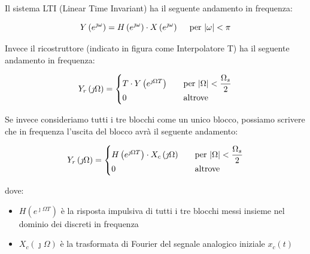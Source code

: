 Il sistema LTI (Linear Time Invariant) ha il seguente andamento in frequenza: 

{
    \Large 
    \begin{equation}
        Y \left(e^{\jmath \omega}\right)
        =
        H \left(e^{\jmath \omega}\right) \cdot X \left(e^{\jmath \omega}\right)
        \quad
        \text{ per } \abs{\omega} < \pi
    \end{equation}
}

\newpage 

Invece il ricostruttore (indicato in figura come Interpolatore T) ha il seguente andamento in frequenza: 

{
    \Large 
    \begin{equation}
        \setlength{\jot}{10pt} %
        Y_r \left(\jmath \Omega\right) 
        = 
        \begin{cases}
            T \cdot Y \left(e^{\jmath \Omega T}\right)
            \quad
            &\text{per }
            \abs{\Omega} < \dfrac{\Omega_s}{2} 
            \\
            0 \quad &\text{altrove }
        \end{cases}
    \end{equation}
}

Se invece consideriamo tutti i tre blocchi come un unico blocco, 
possiamo scrivere che in frequenza l'uscita del blocco avrà il seguente andamento: 

{
    \Large 
    \begin{equation}
        \setlength{\jot}{10pt} %
        Y_r \left(\jmath \Omega\right) 
        = 
        \begin{cases}
            H \left(e^{\jmath \Omega T}\right) \cdot X_c \left(\jmath \Omega\right)
            \quad
            &\text{per }
            \abs{\Omega} < \dfrac{\Omega_s}{2} 
            \\
            0 \quad &\text{altrove }
        \end{cases}
    \end{equation}
}

dove: 

\begin{itemize}
    \item $H \left(e^{\jmath \Omega T}\right)$ è la risposta impulsiva di tutti i tre blocchi messi insieme nel dominio dei discreti in frequenza 
    \item $X_c \left(\jmath \Omega\right)$ è la trasformata di Fourier del segnale analogico iniziale $x_c \left(t\right)$
\end{itemize}

